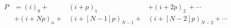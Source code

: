 \documentclass[preview]{standalone}
\begin{document}
\begin{align*}
P &= (i)_0+&(i+p)_1&+(i+2p)_2\:+\cdots\\&+(i+Np)_n+&(i+[N-1]p)_{N-1}+&(i+[N-2]p)_{N-2}+\cdots
\end{align*}
\end{document}
